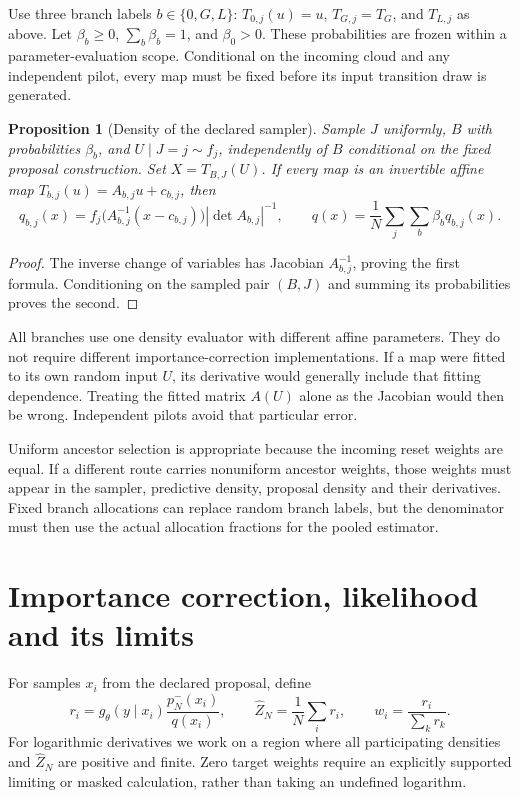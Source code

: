 \documentclass[11pt,a4paper]{article}
\newtheorem{proposition}{Proposition}[section]
\begin{document}
Use three branch labels \(b\in\{0,G,L\}\):
\(T_{0,j}(u)=u\), \(T_{G,j}=T_G\), and \(T_{L,j}\) as above.
Let \(\beta_b\geq0\), \(\sum_b\beta_b=1\), and \(\beta_0>0\).
These probabilities are frozen within a parameter-evaluation scope.
Conditional on the incoming cloud and any independent pilot, every map
must be fixed before its input transition draw is generated.

\begin{proposition}[Density of the declared sampler]
Sample \(J\) uniformly, \(B\) with probabilities \(\beta_b\), and
\(U\mid J=j\sim f_j\), independently of \(B\) conditional on the fixed
proposal construction. Set \(X=T_{B,J}(U)\). If every map is an invertible
affine map \(T_{b,j}(u)=A_{b,j}u+c_{b,j}\), then
\begin{equation}
\label{eq:mapped-density}
 q_{b,j}(x)=
 f_j\bigl(A_{b,j}^{-1}(x-c_{b,j})\bigr)
 |\det A_{b,j}|^{-1},\qquad
 q(x)=\frac1N\sum_j\sum_b\beta_b q_{b,j}(x).
\end{equation}
\end{proposition}
\begin{proof}
The inverse change of variables has Jacobian \(A_{b,j}^{-1}\), proving
the first formula. Conditioning on the sampled pair \((B,J)\) and summing
its probabilities proves the second.
\end{proof}

All branches use one density evaluator with different affine parameters.
They do not require different importance-correction implementations.
If a map were fitted to its own random input \(U\), its derivative would
generally include that fitting dependence. Treating the fitted matrix
\(A(U)\) alone as the Jacobian would then be wrong. Independent pilots
avoid that particular error.

Uniform ancestor selection is appropriate because the incoming reset
weights are equal. If a different route carries nonuniform ancestor
weights, those weights must appear in the sampler, predictive density,
proposal density and their derivatives. Fixed branch allocations can
replace random branch labels, but the denominator must then use the
actual allocation fractions for the pooled estimator.

\section{Importance correction, likelihood and its limits}

For samples \(x_i\) from the declared proposal, define
\begin{equation}
\label{eq:importance-ratio}
 r_i=g_\theta(y\mid x_i)\frac{p_N^-(x_i)}{q(x_i)},\qquad
 \widehat Z_N=\frac1N\sum_i r_i,\qquad
 w_i=\frac{r_i}{\sum_k r_k}.
\end{equation}
For logarithmic derivatives we work on a region where all participating
densities and \(\widehat Z_N\) are positive and finite.
Zero target weights require an explicitly supported limiting or masked
calculation, rather than taking an undefined logarithm.
\end{document}
